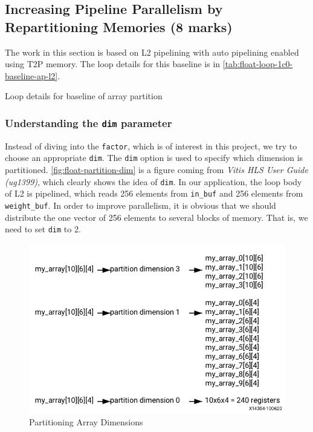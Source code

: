 \subsection{Increasing Pipeline Parallelism by Repartitioning Memories (8 marks)}\label{sec:1c}

The work in this section is based on L2 pipelining with auto pipelining enabled using T2P memory.
The loop details for this baseline is in \autoref{tab:float-loop-1c0-baseline-ap-l2}.

\begin{table}[ht!]
    \caption{Loop details for baseline of array partition}
    \label{tab:float-loop-1c0-baseline-ap-l2}
    \centering
    
\end{table}

\subsubsection{Understanding the \texttt{dim} parameter}\label{sec:1cDim}

Instead of diving into the \texttt{factor}, which is of interest in this project,
we try to choose an appropriate \texttt{dim}.
The \texttt{dim} option is used to specify which dimension is partitioned.
\autoref{fig:float-partition-dim} is a figure coming from \textit{Vitis HLS User Guide (ug1399)}, which clearly shows the idea of \texttt{dim}.
In our application, the loop body of L2 is pipelined, which reads 256 elements from \texttt{in\_buf} and 256 elements from \texttt{weight\_buf}.
In order to improve parallelism, it is obvious that we should distribute the one vector of 256 elements to several blocks of memory.
That is, we need to set \texttt{dim} to 2.

\begin{figure}[ht!]
    \centering
    \includegraphics[scale=0.5]{images/float-partition-dim.png}
    \caption{Partitioning Array Dimensions}
    \label{fig:float-partition-dim}
\end{figure}

